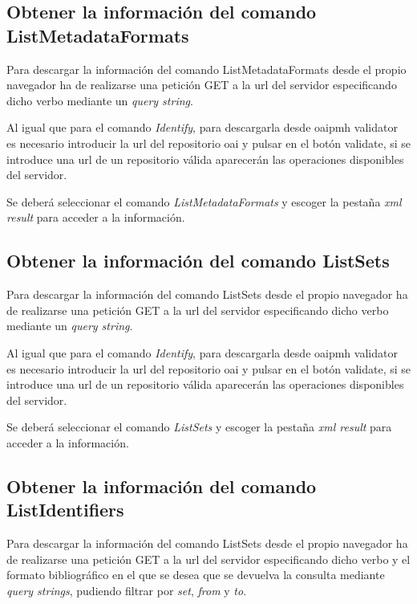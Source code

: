\subsection{Obtener la información del comando ListMetadataFormats}

Para descargar la información del comando ListMetadataFormats desde el propio navegador ha de realizarse una petición GET a la \acrshort{url} del servidor especificando dicho verbo mediante un \textit{query string}.

Al igual que para el comando \textit{Identify}, para descargarla desde \acrshort{oaipmh} validator es necesario introducir la \acrshort{url} del repositorio \acrshort{oai} y pulsar en el botón validate, si se introduce una \acrshort{url} de un repositorio válida aparecerán las operaciones disponibles del servidor.

Se deberá seleccionar el comando \textit{ListMetadataFormats} y escoger la pestaña \textit{\acrshort{xml} result} para acceder a la información.

\subsection{Obtener la información del comando ListSets}

Para descargar la información del comando ListSets desde el propio navegador ha de realizarse una petición GET a la \acrshort{url} del servidor especificando dicho verbo mediante un \textit{query string}.

Al igual que para el comando \textit{Identify}, para descargarla desde \acrshort{oaipmh} validator es necesario introducir la \acrshort{url} del repositorio \acrshort{oai} y pulsar en el botón validate, si se introduce una \acrshort{url} de un repositorio válida aparecerán las operaciones disponibles del servidor.

Se deberá seleccionar el comando \textit{ListSets} y escoger la pestaña \textit{\acrshort{xml} result} para acceder a la información.

\subsection{Obtener la información del comando ListIdentifiers}

Para descargar la información del comando ListSets desde el propio navegador ha de realizarse una petición GET a la \acrshort{url} del servidor especificando dicho verbo y el formato bibliográfico en el que se desea que se devuelva la consulta mediante \textit{query strings}, pudiendo filtrar por \textit{set}, \textit{from} y \textit{to}.

